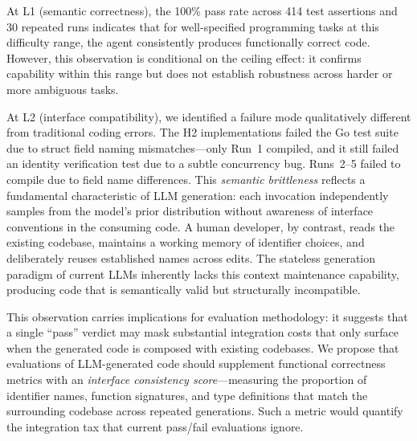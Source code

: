 \documentclass[conference]{IEEEtran}
\begin{document}
At L1 (semantic correctness), the 100\% pass rate across 414 test assertions and 30 repeated runs indicates that for well-specified programming tasks at this difficulty range, the agent consistently produces functionally correct code. However, this observation is conditional on the ceiling effect: it confirms capability within this range but does not establish robustness across harder or more ambiguous tasks.

At L2 (interface compatibility), we identified a failure mode qualitatively different from traditional coding errors. The H2 implementations failed the Go test suite due to struct field naming mismatches---only Run~1 compiled, and it still failed an identity verification test due to a subtle concurrency bug. Runs~2--5 failed to compile due to field name differences. This \emph{semantic brittleness} reflects a fundamental characteristic of LLM generation: each invocation independently samples from the model's prior distribution without awareness of interface conventions in the consuming code. A human developer, by contrast, reads the existing codebase, maintains a working memory of identifier choices, and deliberately reuses established names across edits. The stateless generation paradigm of current LLMs inherently lacks this context maintenance capability, producing code that is semantically valid but structurally incompatible.

This observation carries implications for evaluation methodology: it suggests that a single ``pass'' verdict may mask substantial integration costs that only surface when the generated code is composed with existing codebases. We propose that evaluations of LLM-generated code should supplement functional correctness metrics with an \emph{interface consistency score}---measuring the proportion of identifier names, function signatures, and type definitions that match the surrounding codebase across repeated generations. Such a metric would quantify the integration tax that current pass/fail evaluations ignore.
\end{document}
